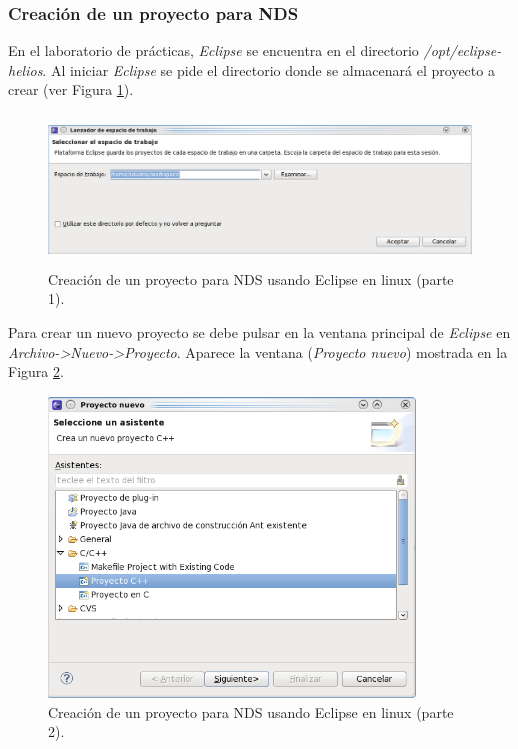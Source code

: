 \subsubsection{Creación de un proyecto para NDS}
En  el laboratorio de prácticas, \textit{Eclipse} se encuentra en el directorio \textit{/opt/eclipse-helios}.  Al iniciar \textit{Eclipse} se pide el directorio donde se almacenará el proyecto a crear (ver Figura \ref{fig_pig_p3_c1_eclipel1}).

\begin{figure}[t]
\centering
\includegraphics[height=4cm]{./Figuras/C2/c2_instan1.png}
\caption{Creación de un proyecto para NDS usando Eclipse en linux (parte 1).}
\label{fig_pig_p3_c1_eclipel1}
 \end{figure}


Para crear un nuevo proyecto se debe pulsar en la ventana principal de \textit{Eclipse} en \textit{Archivo->Nuevo->Proyecto}.  Aparece la ventana (\textit{Proyecto nuevo}) mostrada en la Figura \ref{fig_pig_p3_c1_eclipel2}.

\begin{figure}[t]
	\centering
	\includegraphics[height=8cm]{./Figuras/C2/c2_instan2.png}
	\caption{Creación de un proyecto para NDS usando Eclipse en linux (parte 2).}
	\label{fig_pig_p3_c1_eclipel2}
\end{figure}

